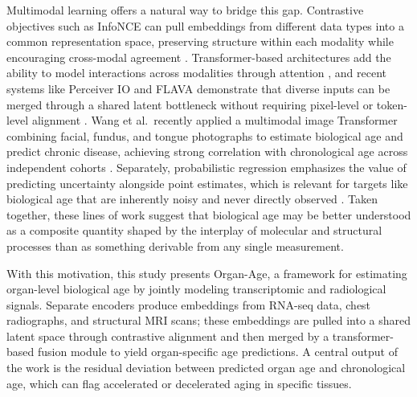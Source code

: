 \documentclass[10pt,twocolumn]{article}
\begin{document}
Multimodal learning offers a natural way to bridge this gap. Contrastive objectives such as
InfoNCE can pull embeddings from different data types into a common representation space,
preserving structure within each modality while encouraging cross-modal agreement
\cite{oord2018cpc,chen2020simclr,radford2021clip}. Transformer-based architectures add the
ability to model interactions across modalities through attention \cite{vaswani2017}, and recent
systems like Perceiver IO and FLAVA demonstrate that diverse inputs can be merged through a
shared latent bottleneck without requiring pixel-level or token-level alignment
\cite{jaegle2021perceiver,singh2021flava}. Wang et al.\ recently applied a multimodal image
Transformer combining facial, fundus, and tongue photographs to estimate biological age and
predict chronic disease, achieving strong correlation with chronological age across independent
cohorts \cite{wang2024multimodal}. Separately, probabilistic regression emphasizes the
value of predicting uncertainty alongside point estimates, which is relevant for targets like
biological age that are inherently noisy and never directly observed \cite{kendall2017}. Taken
together, these lines of work suggest that biological age may be better understood as a composite
quantity shaped by the interplay of molecular and structural processes than as something derivable
from any single measurement.

With this motivation, this study presents Organ-Age, a framework for estimating organ-level biological age
by jointly modeling transcriptomic and radiological signals. Separate encoders produce embeddings
from RNA-seq data, chest radiographs, and structural MRI scans; these embeddings are pulled into
a shared latent space through contrastive alignment and then merged by a transformer-based fusion
module to yield organ-specific age predictions. A central output of the work is the residual
deviation between predicted organ age and chronological age, which can flag accelerated or
decelerated aging in specific tissues.
\end{document}
